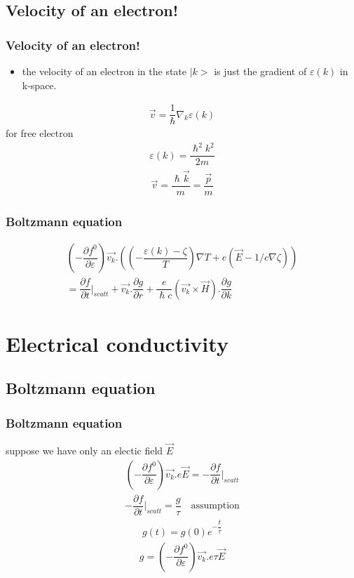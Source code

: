 \documentclass{beamer}
\begin{document}
\subsection{Velocity of an electron!}
\begin{frame}
\frametitle{Velocity of an electron!}
\begin{itemize}
\pause
\item the velocity of an electron in the state $|k>$ is just the gradient of $\varepsilon (k)$ in k-space.
\end{itemize}
\pause
\begin{align*}
\vec{v} = \dfrac{1}{\hslash} \nabla _k \varepsilon (k)
\end{align*}
\pause
for free electron 
\begin{align*}
\varepsilon (k) = \dfrac{\hslash^2 k^2}{2m}
\end{align*}
\begin{align*}
\vec{v} = \dfrac{\hslash \vec{k}}{m} = \dfrac{\vec{p}}{m}
\end{align*}
\end{frame}
\begin{frame}
\frametitle{Boltzmann equation}
\begin{align*}
(- \dfrac{\partial f^0}{\partial \varepsilon}) \vec{v_k} . ((-\dfrac{\varepsilon (k) - \zeta}{T}) \nabla T + e (\vec{E} - 1/c \nabla \zeta)) \\
= \dfrac{\partial f}{\partial t} \big| _{scatt} + \vec{v_k}.\dfrac{\partial g}{\partial r} + \dfrac{e}{\hslash c} (\vec{v_k} \times \vec{H}) . \dfrac{\partial g}{\partial k}
\end{align*}
\end{frame}
\section{Electrical conductivity}
\subsection{Boltzmann equation}
\begin{frame}
\frametitle{Boltzmann equation}
suppose we have only an electic field $\vec{E}$
\pause
\begin{align*}
(- \dfrac{\partial f^0}{\partial \varepsilon}) \vec{v_k} . e \vec{E} = -\dfrac{\partial f}{\partial t} \big| _{scatt}
\end{align*}
\pause
\begin{align*}
-\dfrac{\partial f}{\partial t} \big| _{scatt} = \dfrac{g}{\tau} \quad  \text{assumption}
\end{align*}
\pause
\begin{align*}
g(t) = g(0)e^{- \dfrac{t}{\tau}}
\end{align*}
\pause
\begin{align*}
\boxed{g = (- \dfrac{\partial f^0}{\partial \varepsilon}) \vec{v_k} . e \tau \vec{E}} 
\end{align*}
\end{frame}
\end{document}
